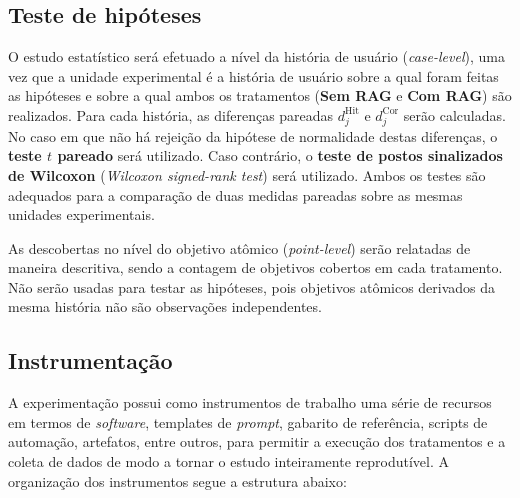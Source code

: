 
\subsection{Teste de hipóteses}

O estudo estatístico será efetuado a nível da história de usuário (\textit{case-level}), uma vez que a unidade experimental é a história de usuário sobre a qual foram feitas as hipóteses e sobre a qual ambos os tratamentos (\textbf{Sem RAG} e \textbf{Com RAG}) são realizados. Para cada história, as diferenças pareadas $d_j^{\mathrm{Hit}}$ e $d_j^{\mathrm{Cor}}$ serão calculadas. No caso em que não há rejeição da hipótese de normalidade destas diferenças, o \textbf{teste $t$ pareado} será utilizado. Caso contrário, o \textbf{teste de postos sinalizados de Wilcoxon} (\textit{Wilcoxon signed-rank test}) \cite{wohlin2000} será utilizado. Ambos os testes são adequados para a comparação de duas medidas pareadas sobre as mesmas unidades experimentais.

As descobertas no nível do objetivo atômico (\textit{point-level}) serão relatadas de maneira descritiva, sendo a contagem de objetivos cobertos em cada tratamento. Não serão usadas para testar as hipóteses, pois objetivos atômicos derivados da mesma história não são observações independentes.

\subsection{Instrumentação}

A experimentação possui como instrumentos de trabalho uma série de recursos em termos de \textit{software}, templates de \textit{prompt}, gabarito de referência, scripts de automação, artefatos, entre outros, para permitir a execução dos tratamentos e a coleta de dados de modo a tornar o estudo inteiramente reprodutível. A organização dos instrumentos segue a estrutura abaixo:

